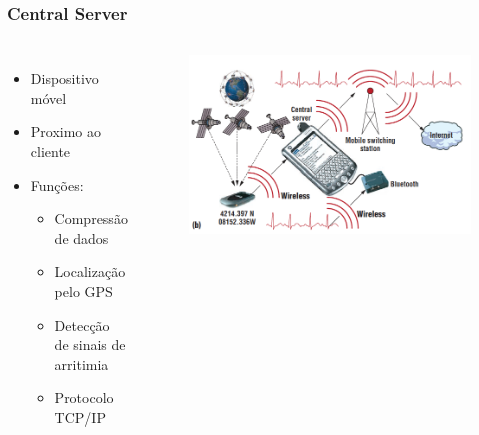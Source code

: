 \documentclass{beamer}
\begin{document}

\begin{frame}
\frametitle{Central Server}

\begin{columns}[c] %

	\begin{itemize}
		\item Dispositivo móvel
		\item Proximo ao cliente
		\item Funções:
		\begin{itemize}
			\item Compressão de dados
			\item Localização pelo GPS
			\item Detecção de sinais de arritimia
			\item Protocolo TCP/IP
		\end{itemize}
	\end{itemize}

	\begin{figure}
		\includegraphics[width=1\linewidth]{figura2-central-server.png}
	\end{figure}

\end{columns}

\end{frame}


\end{document}
